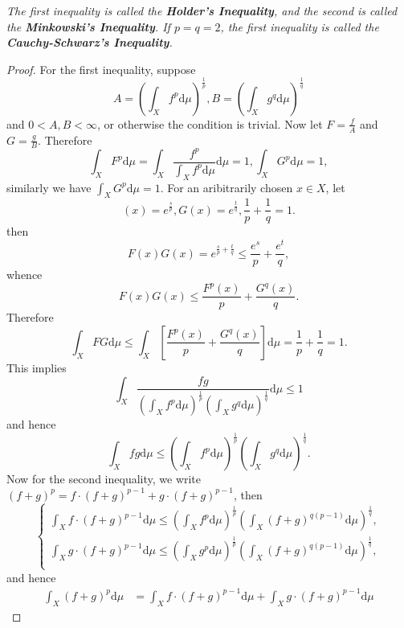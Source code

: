\begin{note}\em
The first inequality is called the \textbf{Holder's Inequality}, and the second is called the \textbf{Minkowski's Inequality}. If $p=q=2$, the first inequality is called the \textbf{Cauchy-Schwarz's Inequality}.
\end{note}
\begin{proof}
For the first inequality, suppose 
$$
A=\left( \int_X{f^p\mathrm{d}\mu} \right) ^{\frac{1}{p}},B=\left( \int_X{g^q\mathrm{d}\mu} \right) ^{\frac{1}{q}}
$$
and $0<A,B<\infty$, or otherwise the condition is trivial. Now let $F=\frac{f}{A}$ and $G=\frac{g}{B}$. Therefore 
$$
\int_X{F^p\mathrm{d}\mu}=\int_X{\frac{f^p}{\int_X{f^p\mathrm{d}\mu}}\mathrm{d}\mu}=1,\int_X{G^p\mathrm{d}\mu}=1,
$$
similarly we have $\int_XG^p\mathrm{d}\mu=1$. For an aribitrarily chosen $x\in X$, let 
$$
\left( x \right) =e^{\frac{s}{p}},G\left( x \right) =e^{\frac{t}{q}},\frac{1}{p}+\frac{1}{q}=1.
$$
then 
$$
F\left( x \right) G\left( x \right) =e^{\frac{s}{p}+\frac{t}{q}}\le \frac{e^s}{p}+\frac{e^t}{q},
$$
whence 
$$
F\left( x \right) G\left( x \right) \le \frac{F^p\left( x \right)}{p}+\frac{G^q\left( x \right)}{q}.
$$
Therefore 
$$
\int_X{FG\mathrm{d}\mu}\le \int_X{\left[ \frac{F^p\left( x \right)}{p}+\frac{G^q\left( x \right)}{q} \right] \mathrm{d}\mu}=\frac{1}{p}+\frac{1}{q}=1.
$$
This implies 
$$
\int_X{\frac{fg}{\left( \int_X{f^p\mathrm{d}\mu} \right) ^{\frac{1}{p}}\left( \int_X{g^q\mathrm{d}\mu} \right) ^{\frac{1}{q}}}\mathrm{d}\mu}\le 1
$$
and hence 
$$
\int_X{fg\mathrm{d}\mu}\le \left( \int_X{f^p\mathrm{d}\mu} \right) ^{\frac{1}{p}}\left( \int_X{g^q\mathrm{d}\mu} \right) ^{\frac{1}{q}}.
$$
Now for the second inequality, we write $\left( f+g \right) ^p=f\cdot \left( f+g \right) ^{p-1}+g\cdot \left( f+g \right) ^{p-1}$, then 
$$
\left\{ \begin{array}{c}
	\int_X{f\cdot \left( f+g \right) ^{p-1}\mathrm{d}\mu}\le \left( \int_X{f^p\mathrm{d}\mu} \right) ^{\frac{1}{p}}\left( \int_X{\left( f+g \right) ^{q\left( p-1 \right)}\mathrm{d}\mu} \right) ^{\frac{1}{q}},\\
	\int_X{g\cdot \left( f+g \right) ^{p-1}\mathrm{d}\mu}\le \left( \int_X{g^p\mathrm{d}\mu} \right) ^{\frac{1}{p}}\left( \int_X{\left( f+g \right) ^{q\left( p-1 \right)}\mathrm{d}\mu} \right) ^{\frac{1}{q}},\\
\end{array} \right. 
$$
and hence 
$$
\begin{aligned}
\int_X{\left( f+g \right) ^p\mathrm{d}\mu}&=\int_X{f\cdot \left( f+g \right) ^{p-1}\mathrm{d}\mu}+\int_X{g\cdot \left( f+g \right) ^{p-1}\mathrm{d}\mu}

\end{aligned}$$
\end{proof}
